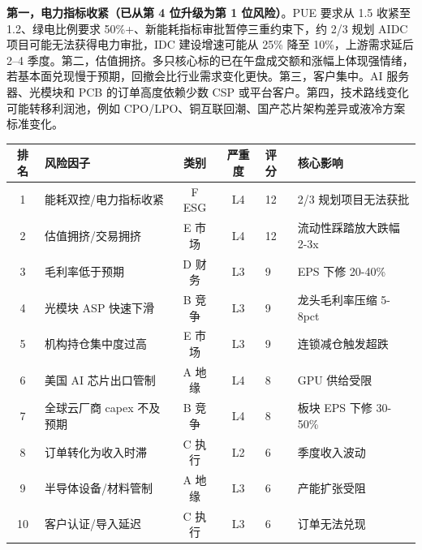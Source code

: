 \begin{riskbox}[核心风险]
\textbf{第一，电力指标收紧（已从第 4 位升级为第 1 位风险）}。PUE 要求从 1.5 收紧至 1.2、绿电比例要求 50\%+、新能耗指标审批暂停三重约束下，约 2/3 规划 AIDC 项目可能无法获得电力审批，IDC 建设增速可能从 25\% 降至 10\%，上游需求延后 2--4 季度。第二，估值拥挤。多只核心标的已在午盘成交额和涨幅上体现强情绪，若基本面兑现慢于预期，回撤会比行业需求变化更快。第三，客户集中。AI 服务器、光模块和 PCB 的订单高度依赖少数 CSP 或平台客户。第四，技术路线变化可能转移利润池，例如 CPO/LPO、铜互联回潮、国产芯片架构差异或液冷方案标准变化。
\end{riskbox}

\begin{exhibitbox}
\begin{tabularx}{\textwidth}{c L{3.2cm} c c R{1.0cm} L{2.8cm}}
\toprule
\textbf{排名} & \textbf{风险因子} & \textbf{类别} & \textbf{严重度} & \textbf{评分} & \textbf{核心影响}\\
 & 能耗双控/电力指标收紧 & F ESG & L4 & 12 & 2/3 规划项目无法获批\\
2 & 估值拥挤/交易拥挤 & E 市场 & L4 & 12 & 流动性踩踏放大跌幅 2-3x\\
3 & 毛利率低于预期 & D 财务 & L3 & 9 & EPS 下修 20-40\%\\
4 & 光模块 ASP 快速下滑 & B 竞争 & L3 & 9 & 龙头毛利率压缩 5-8pct\\
5 & 机构持仓集中度过高 & E 市场 & L3 & 9 & 连锁减仓触发超跌\\
6 & 美国 AI 芯片出口管制 & A 地缘 & L4 & 8 & GPU 供给受限\\
7 & 全球云厂商 capex 不及预期 & B 竞争 & L4 & 8 & 板块 EPS 下修 30-50\%\\
8 & 订单转化为收入时滞 & C 执行 & L2 & 6 & 季度收入波动\\
9 & 半导体设备/材料管制 & A 地缘 & L3 & 6 & 产能扩张受阻\\
10 & 客户认证/导入延迟 & C 执行 & L3 & 6 & 订单无法兑现\\
\bottomrule
\end{tabularx}
\end{exhibitbox}

